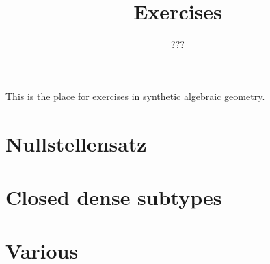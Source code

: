 \documentclass{../util/zariski-small}
\title{Exercises}
\theoremstyle{break}
\begin{document}
\author{???}

\maketitle

This is the place for exercises in synthetic algebraic geometry.

\section{Nullstellensatz}


\section{Closed dense subtypes}


\section{Various}


\printbibliography
\end{document}
